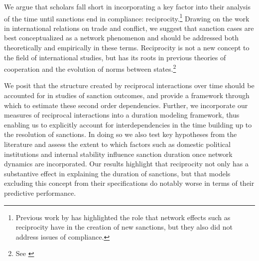 We argue that scholars fall short in incorporating a key factor into their analysis of the time until sanctions end in compliance: reciprocity.\footnote{Previous work by \cite{cranmer2014reciprocity} has highlighted the role that network effects such as reciprocity have in the creation of new sanctions, but they also did not address issues of compliance.} Drawing on the work in international relations on trade and conflict, we suggest that sanction cases are best conceptualized as a network phenomenon and should be addressed both theoretically and empirically in these terms. Reciprocity is not a new concept to the field of international studies, but has its roots in previous theories of cooperation and the evolution of norms between states.\footnote{See \cite{choucri:north:1972,goldstein1991reciprocity, richardsonai:1960, ward1992reciprocity}} 

We posit that the structure created by reciprocal interactions over time should be accounted for in studies of sanction outcomes, and provide a framework through which to estimate these second order dependencies. Further, we incorporate our measures of reciprocal interactions into a duration modeling framework, thus enabling us to explicitly account for interdependencies in the time building up to the resolution of sanctions. In doing so we also test key hypotheses from the literature and assess the extent to which factors such as domestic political institutions and internal stability influence sanction duration once network dynamics are incorporated.  Our results highlight that reciprocity not only has a substantive effect in explaining the duration of sanctions, but that models excluding this concept from their specifications do notably worse in terms of their predictive performance.
